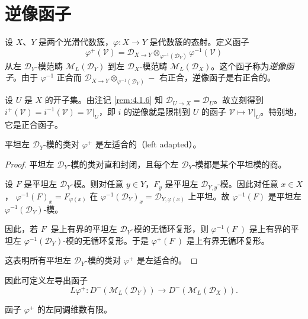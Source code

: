 \section{逆像函子}

设 $X$、$Y$ 是两个光滑代数簇，$\varphi:X\to Y$ 是代数簇的态射。定义函子
$$\varphi^+(\mathcal{V})=\mathcal{D}_{X\to Y}\otimes_{\varphi^{-1}(\mathcal{D}_Y)}\varphi^{-1}(\mathcal{V})$$
从左 $\mathcal{D}_Y$-模范畴 $\mathcal{M}_L(\mathcal{D}_Y)$ 到左 $\mathcal{D}_X$-模范畴 $\mathcal{M}_L(\mathcal{D}_X)$。这个函子称为\emph{逆像函子}。由于 $\varphi^{-1}$ 正合而 $\mathcal{D}_{X\to Y}\otimes_{\varphi^{-1}(\mathcal{D}_Y)}-$ 右正合，逆像函子是右正合的。

\begin{remark}\label{rem:4.3.1}
设 $U$ 是 $X$ 的开子集。由注记 \ref{rem:4.1.6} 知 $\mathcal{D}_{U\to X}=\mathcal{D}_U$。故立刻得到
$i^+(\mathcal{V})=i^{-1}(\mathcal{V})=\mathcal{V}|_U$，即 $i$ 的逆像就是限制到 $U$ 的函子
$\mathcal{V}\mapsto\mathcal{V}|_U$。特别地，它是正合函子。
\end{remark}

\begin{lemma}\label{lem:4.3.2}
平坦左 $\mathcal{D}_Y$-模的类对 $\varphi^+$ 是左适合的（left adapted）。
\end{lemma}

\begin{proof}
平坦左 $\mathcal{D}_Y$-模的类对直和封闭，且每个左 $\mathcal{D}_Y$-模都是某个平坦模的商。

设 $F$ 是平坦左 $\mathcal{D}_Y$-模。则对任意 $y\in Y$，$F_y$ 是平坦左 $\mathcal{D}_{Y,y}$-模。因此对任意 $x\in X$，
$\varphi^{-1}(F)_x=F_{\varphi(x)}$ 在 $\varphi^{-1}(\mathcal{D}_Y)_x=\mathcal{D}_{Y,\varphi(x)}$ 上平坦。故
$\varphi^{-1}(F)$ 是平坦左 $\varphi^{-1}(\mathcal{D}_Y)$-模。

因此，若 $F^\cdot$ 是上有界的平坦左 $\mathcal{D}_Y$-模的无循环复形，则 $\varphi^{-1}(F^\cdot)$ 是上有界的平坦左
$\varphi^{-1}(\mathcal{D}_Y)$-模的无循环复形。于是 $\varphi^+(F^\cdot)$ 是上有界无循环复形。

这表明所有平坦左 $\mathcal{D}_Y$-模的类对 $\varphi^+$ 是左适合的。
\end{proof}

因此可定义左导出函子
$$L\varphi^+:D^-(\mathcal{M}_L(\mathcal{D}_Y))\longrightarrow D^-(\mathcal{M}_L(\mathcal{D}_X)).$$

\begin{lemma}\label{lem:4.3.3}
函子 $\varphi^+$ 的左同调维数有限。
\end{lemma}

